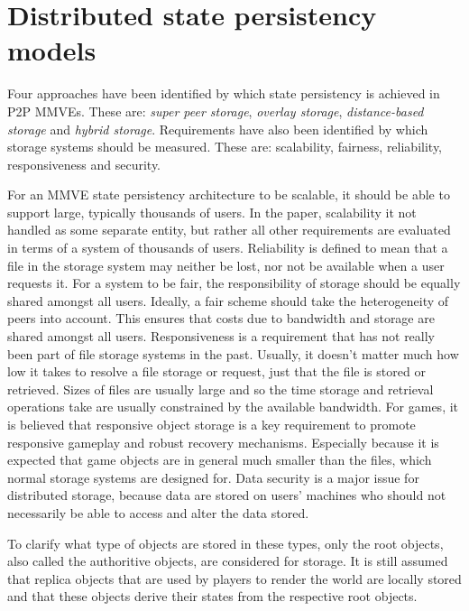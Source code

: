 \documentclass[10pt,a4paper,conference]{IEEEtran}
\begin{document}
\section{Distributed state persistency models}
\label{current_models}

Four approaches have been identified by which state persistency is achieved in P2P MMVEs. These are: \emph{super peer storage}, \emph{overlay
storage}, \emph{distance-based storage} and \emph{hybrid storage}. Requirements have also been identified by which storage systems should be
measured. These are: scalability, fairness, reliability, responsiveness and security.

For an MMVE state persistency architecture to be scalable, it should be able to support large, typically thousands of users. In the paper,
scalability it not handled as some separate entity, but rather all other requirements are evaluated in terms of a system of thousands of users.
Reliability is defined to mean that a file in the storage system may neither be lost, nor not be available when a user requests it.
For a system to be fair, the responsibility of storage should be equally shared amongst all users. Ideally, a fair scheme should take the
heterogeneity of peers into account. This ensures that costs due to bandwidth and storage are shared amongst all users.
Responsiveness is a requirement that has not really been part of file storage systems in the past. Usually, it doesn't matter much how low it takes
to resolve a file storage or request, just that the file is stored or retrieved. Sizes of files are usually large and so the time storage and
retrieval operations take are usually constrained by the available bandwidth. For games, it is believed that responsive object storage is a key
requirement to promote responsive gameplay and robust recovery mechanisms. Especially because it is expected that game objects are in general much
smaller than the files, which normal storage systems are designed for.
Data security is a major issue for distributed storage, because data are stored on users' machines who should not necessarily be able to access and
alter the data stored.

To clarify what type of objects are stored in these types, only the root objects, also called the authoritive objects, are considered for storage. It
is still assumed that replica objects that are used by players to render the world are locally stored and that these objects derive their states from
the respective root objects.
\end{document}
